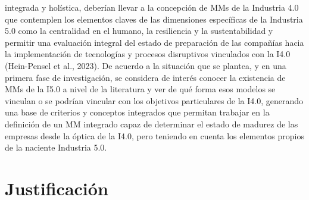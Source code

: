 \documentclass{article}
\begin{document}
integrada y holística, deberían llevar a la concepción de MMs de la
Industria 4.0 que contemplen los elementos claves de las dimensiones
específicas de la Industria 5.0 como la centralidad en el humano, la
resiliencia y la sustentabilidad y permitir una evaluación integral del
estado de preparación de las compañías hacia la implementación de
tecnologías y procesos disruptivos vinculados con la I4.0 (Hein-Pensel
et al., 2023). De acuerdo a la situación que se plantea, y en una
primera fase de investigación, se considera de interés conocer la
existencia de MMs de la I5.0 a nivel de la literatura y ver de qué forma
esos modelos se vinculan o se podrían vincular con los objetivos
particulares de la I4.0, generando una base de criterios y conceptos
integrados que permitan trabajar en la definición de un MM integrado
capaz de determinar el estado de madurez de las empresas desde la óptica
de la I4.0, pero teniendo en cuenta los elementos propios de la naciente
Industria 5.0.

\section{Justificación}\label{justificaciuxf3n}
\end{document}

